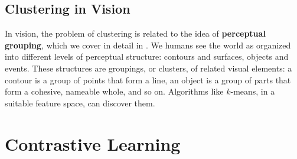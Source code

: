



\subsection{Clustering in Vision} In vision, the problem of clustering is related to the idea of \textbf{perceptual grouping}, which we cover in detail in \chap{\ref{chapter:perceptual_organization}}. We humans see the world as organized into different levels of perceptual structure: contours and surfaces, objects and events. These structures are groupings, or clusters, of related visual elements: a contour is a group of points that form a line, an object is a group of parts that form a cohesive, nameable whole, and so on. Algorithms like $k$-means, in a suitable feature space, can discover them.


\section{Contrastive Learning}\label{sec:representation_learning:contrastive_learning}

